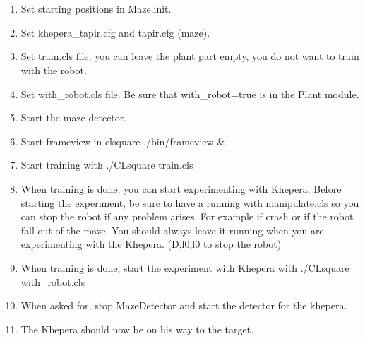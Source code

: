 \section{\clsquare}
\label{sec:howto:clsquare}

    \begin{enumerate}
        \item Set starting positions in Maze.init.
        \item Set khepera\_tapir.cfg and tapir.cfg (maze).
        \item Set train.cls file, you can leave the plant part empty, 
            you do not want to train with the robot.
        \item Set with\_robot.cls file. Be sure that with\_robot=true is in 
            the Plant module.
        \item Start the maze detector.
        \item Start frameview in clsquare ./bin/frameview \&
        \item Start training with ./CLsquare train.cls
        \item When training is done, you can start experimenting with 
            Khepera. Before starting the experiment, be sure to have a 
            \clsquare{} running with manipulate.cls so you can stop the 
            robot if any problem arises. For example if \clsquare{} crash 
            or if the robot fall out of the maze. You should always 
            leave it running when you are experimenting with the 
            Khepera. (D,l0,l0 to stop the robot)
        \item When training is done, start the experiment with Khepera 
            with ./CLsquare with\_robot.cls
        \item When asked for, stop MazeDetector and start the detector 
            for the khepera.
        \item The Khepera should now be on his way to the target.
    \end{enumerate}

